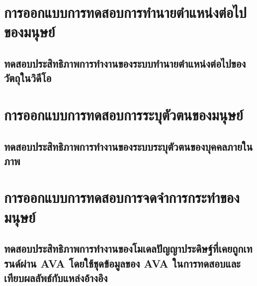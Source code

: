 \section{การออกแบบการทดสอบการทำนายตำแหน่งต่อไปของมนุษย์}
\subsection{ทดสอบประสิทธิภาพการทำงานของระบบทำนายตำแหน่งต่อไปของวัตถุในวิดีโอ}

\clearpage

\section{การออกแบบการทดสอบการระบุตัวตนของมนุษย์}
\subsection{ทดสอบประสิทธิภาพการทำงานของระบบระบุตัวตนของบุคคลภายในภาพ}

\clearpage

\section{การออกแบบการทดสอบการจดจำการกระทำของมนุษย์}
\subsection{ทดสอบประสิทธิภาพการทำงานของโมเดลปัญญาประดิษฐ์ที่เคยถูกเทรนด์ผ่าน AVA โดยใช้ชุดข้อมูลของ AVA ในการทดสอบและเทียบผลลัพธ์กับแหล่งอ้างอิง}
